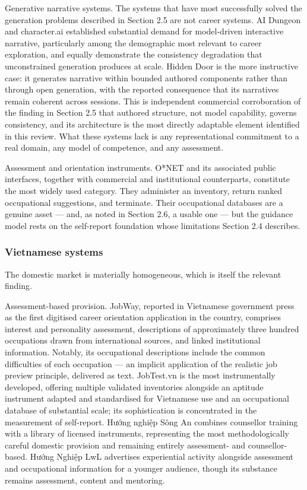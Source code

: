 Generative narrative systems. The systems that have most successfully solved the generation problems described in Section 2.5 are not career systems. AI Dungeon\cite{r87} and character.ai\cite{r88} established substantial demand for model-driven interactive narrative, particularly among the demographic most relevant to career exploration, and equally demonstrate the consistency degradation that unconstrained generation produces at scale. Hidden Door\cite{r89} is the more instructive case: it generates narrative within bounded authored components rather than through open generation, with the reported consequence that its narratives remain coherent across sessions. This is independent commercial corroboration of the finding in Section 2.5 that authored structure, not model capability, governs consistency, and its architecture is the most directly adaptable element identified in this review. What these systems lack is any representational commitment to a real domain, any model of competence, and any assessment.

Assessment and orientation instruments. O*NET and its associated public interfaces, together with commercial and institutional counterparts, constitute the most widely used category. They administer an inventory, return ranked occupational suggestions, and terminate. Their occupational databases are a genuine asset --- and, as noted in Section 2.6, a usable one --- but the guidance model rests on the self-report foundation whose limitations Section 2.4 describes.

\subsubsection{Vietnamese systems}

The domestic market is materially homogeneous, which is itself the relevant finding.

Assessment-based provision. JobWay\cite{r90}, reported in Vietnamese government press as the first digitised career orientation application in the country, comprises interest and personality assessment, descriptions of approximately three hundred occupations drawn from international sources, and linked institutional information. Notably, its occupational descriptions include the common difficulties of each occupation --- an implicit application of the realistic job preview principle, delivered as text. JobTest.vn\cite{r91} is the most instrumentally developed, offering multiple validated inventories alongside an aptitude instrument adapted and standardised for Vietnamese use and an occupational database of substantial scale; its sophistication is concentrated in the measurement of self-report. Hướng nghiệp Sông An\cite{r92} combines counsellor training with a library of licensed instruments, representing the most methodologically careful domestic provision and remaining entirely assessment- and counsellor-based. Hướng Nghiệp LwL\cite{r93} advertises experiential activity alongside assessment and occupational information for a younger audience, though its substance remains assessment, content and mentoring.

